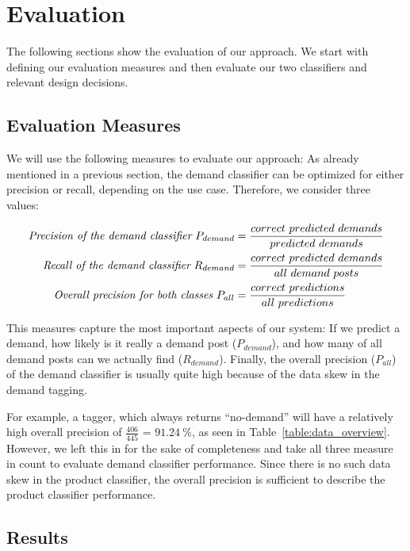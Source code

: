 
\section{Evaluation}
\label{sec:evaluation}

The following sections show the evaluation of our approach.
We start with defining our evaluation measures and then evaluate our two classifiers and relevant design decisions.

\subsection{Evaluation Measures}
\label{sub:evaluation_measures}
We will use the following measures to evaluate our approach:
As already mentioned in a previous section, the demand classifier can be optimized for either precision or recall, depending on the use case.
Therefore, we consider three values:

\begin{align*}
	\emph{Precision of the demand classifier}~P_{demand} 			&= \frac{correct~predicted~demands}{predicted~demands} \\
	\emph{Recall of the demand classifier}~R_{demand} 				&= \frac{correct~predicted~demands}{all~demand~posts} \\
	\emph{Overall precision for both classes}~P_{all} &= \frac{correct~predictions}{all~predictions} \\
\end{align*}

This measures capture the most important aspects of our system: If we predict a demand, how likely is it really a demand post ($P_{demand}$), and how many of all demand posts can we actually find ($R_{demand}$).
Finally, the overall precision ($P_{all}$) of the demand classifier is usually quite high because of the data skew in the demand tagging.

For example, a tagger, which always returns ``no-demand'' will have a relatively high overall precision of $\frac{406}{445}$ = $91.24~\%$, as seen in Table~\ref{table:data_overview}.
However, we left this in for the sake of completeness and take all three measure in count to evaluate demand classifier performance.
Since there is no such data skew in the product classifier, the overall precision is sufficient to describe the product classifier performance.

\subsection{Results}
\label{sub:results}

